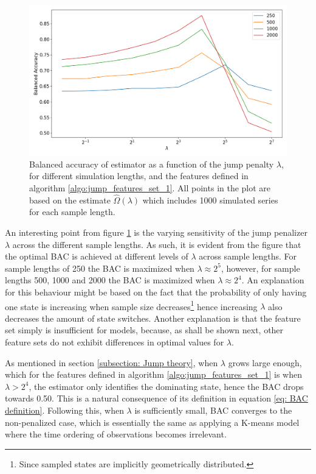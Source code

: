 \begin{figure}[H] 
    \centering
    \includegraphics[width=1\textwidth]{analysis/model_convergence/images/jump_penalties_feature_set_1.png}
    \caption[Balanced accuracy of the \jump estimator using feature set 1]{Balanced accuracy of \jump estimator as a function of the jump penalty $\lambda$, for different simulation lengths, and the features defined in algorithm \ref{algo:jump_features_set_1}. All points in the plot are based on the estimate $\hat{\Omega} (\lambda)$ which includes 1000 simulated series for each sample length.}
    \label{fig: BAC plot feature set 1}
\end{figure}

An interesting point from figure \ref{fig: BAC plot feature set 1} is the varying sensitivity of the jump penalizer $\lambda$ across the different sample lengths. As such, it is evident from the figure that the optimal BAC is achieved at different levels of $\lambda$ across sample lengths. For sample lengths of 250 the BAC is maximized when $\lambda \approx 2^5$, however, for sample lengths 500, 1000 and 2000 the BAC is maximized when $\lambda \approx 2^4$. An explanation for this behaviour might be based on the fact that the probability of only having one state is increasing when sample size decreases\footnote
{Since sampled states are implicitly geometrically distributed.
}
hence increasing $\lambda$ also decreases the amount of state switches. Another explanation is that the feature set simply is insufficient for \jump models, because, as shall be shown next, other feature sets do not exhibit differences in optimal values for $\lambda$.

As mentioned in section \ref{subsection: Jump theory}, when $\lambda$ grows large enough, which for the features defined in algorithm \ref{algo:jump_features_set_1} is when $\lambda > 2^4$, the \jump estimator only identifies the dominating state, hence the BAC drops towards 0.50. This is a natural consequence of its definition in equation \ref{eq: BAC definition}. Following this, when $\lambda$ is sufficiently small, BAC converges to the non-penalized case, which is essentially the same as applying a K-means model where the time ordering of observations becomes irrelevant. 

